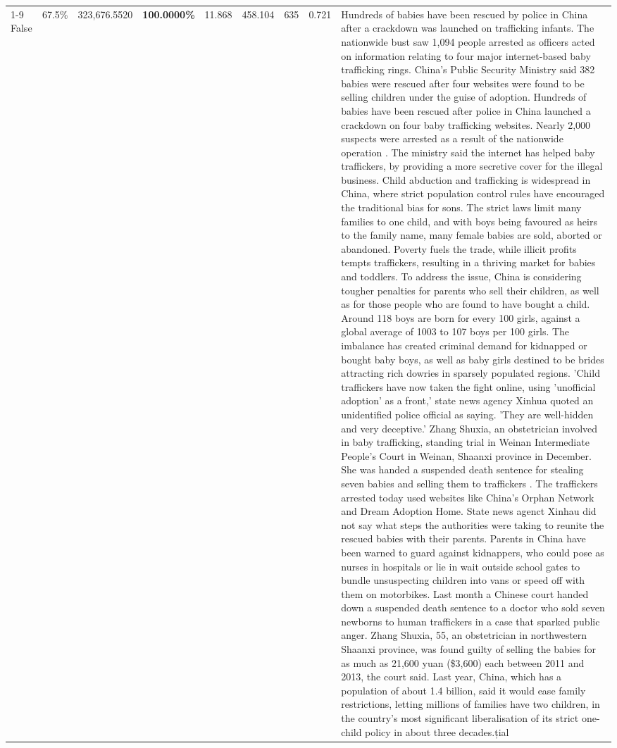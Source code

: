 \begin{table}[H]
\begin{tabular}{lllrlllll}
\cline{1-9}
False & 67.5\% & 323,676.5520 & \bfseries \color{red} 100.0000\% & 11.868 & 458.104 & 635 & 0.721 & Hundreds of babies have been rescued by police in China after a crackdown was launched on trafficking infants. The nationwide bust saw 1,094 people arrested as officers acted on information relating to four major internet-based baby trafficking rings. China's Public Security Ministry said 382 babies were rescued after four websites were found to be selling children under the guise of adoption. Hundreds of babies have been rescued after police in China launched a crackdown on four baby trafficking websites. Nearly 2,000 suspects were arrested as a result of the nationwide operation . The ministry said the internet has helped baby traffickers, by providing a more secretive cover for the illegal business. Child abduction and trafficking is widespread in China, where strict population control rules have encouraged the traditional bias for sons. The strict laws limit many families to one child, and with boys being favoured as heirs to the family name, many female babies are sold, aborted or abandoned. Poverty fuels the trade, while illicit profits tempts traffickers, resulting in a thriving market for babies and toddlers. To address the issue, China is considering tougher penalties for parents who sell their children, as well as for those people who are found to have bought a child. Around 118 boys are born for every 100 girls, against a global average of 1003 to 107 boys per 100 girls. The imbalance has created criminal demand for kidnapped or bought baby boys, as well as baby girls destined to be brides attracting rich dowries in sparsely populated regions. 'Child traffickers have now taken the fight online, using 'unofficial adoption' as a front,' state news agency Xinhua quoted an unidentified police official as saying. 'They are well-hidden and very deceptive.' Zhang Shuxia, an obstetrician involved in baby trafficking, standing trial in Weinan Intermediate People's Court in Weinan, Shaanxi province in December. She was handed a suspended death sentence for stealing seven babies and selling them to traffickers . The traffickers arrested today used websites like China's Orphan Network and Dream Adoption Home. State news agenct Xinhau did not say what steps the authorities were taking to reunite the rescued babies with their parents. Parents in China have been warned to guard against kidnappers, who could pose as nurses in hospitals or lie in wait outside school gates to bundle unsuspecting children into vans or speed off with them on motorbikes. Last month a Chinese court handed down a suspended death sentence to a doctor who sold seven newborns to human traffickers in a case that sparked public anger. Zhang Shuxia, 55, an obstetrician in northwestern Shaanxi province, was found guilty of selling the babies for as much as 21,600 yuan (\$3,600) each between 2011 and 2013, the court said. Last year, China, which has a population of about 1.4 billion, said it would ease family restrictions, letting millions of families have two children, in the country's most significant liberalisation of its strict one-child policy in about three decades.țial \\

\end{tabular}
\end{table}
